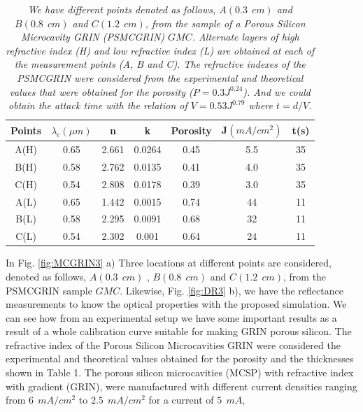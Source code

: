 \documentclass{article}
\begin{document}
\begin{table}
  \centering
  \begin{tabular}{|c|c|c|c|c|c|c|}
    \hline
    \textbf{Points} & $\lambda_c (\mu m)$ & \textbf{n} & \textbf{k} & \textbf{Porosity} & \textbf{J}$(mA/cm^2)$ & \textbf{t(s)}\\
    \hline
    A(H) & 0.65 & 2.661 & 0.0264 & 0.45 & 5.5 & 35 \\
    \hline
    B(H) & 0.58 & 2.762 & 0.0135 & 0.41 & 4.0 & 35 \\
    \hline
    C(H) & 0.54 & 2.808 & 0.0178 & 0.39 & 3.0 & 35 \\
    \hline
    A(L) & 0.65 & 1.442 & 0.0015 & 0.74 & 44 & 11 \\
    \hline
    B(L) & 0.58 & 2.295 & 0.0091 & 0.68 & 32 & 11 \\
    \hline
    C(L) & 0.54 & 2.302 & 0.001 & 0.64 & 24 & 11 \\
    \hline
  \end{tabular}
  \caption{ \emph{We have different points denoted as follows, $ A
      (0.3 \ \ cm) $ and $ B (0.8 \ \ cm) $ and $ C (1.2 \ \ cm) $,
      from the sample of a Porous Silicon Microcavity GRIN
      (PSMCGRIN) $ GMC $. Alternate layers of high refractive index
      (H) and low refractive index (L) are obtained at each of the
      measurement points (A, B and C). The refractive indexes of the
      PSMCGRIN were considered from the experimental and theoretical
      values that were obtained for the porosity ($ P =
      0.3J^{0.24}$). And we could obtain the attack time with the
      relation of $ V = 0.53J ^ {0.79} $ where $ t = d / V $.}}
	\label{tabla:1}
\end{table}
In Fig. \ref{fig:MCGRIN3} a) Three locations at different points are
considered, denoted as follows, $ A (0.3 \ \ cm) $ , $ B (0.8 \ \ cm)
$ and $ C (1.2 \ \ cm) $, from the PSMCGRIN sample $ GMC $. Likewise,
Fig. \ref{fig:DR3} b), we have the reflectance measurements to know
the optical properties with the proposed simulation. We can see how
from an experimental setup we have some important results as a result
of a whole calibration curve suitable for making GRIN porous
silicon. The refractive index of the Porous Silicon Microcavities GRIN
were considered the experimental and theoretical values obtained for
the porosity and the thicknesses shown in Table 1. The porous silicon
microcavities (MCSP) with refractive index with gradient (GRIN), were
manufactured with different current densities ranging from $ 6 \ \ mA
/ cm ^ 2 $ to $ 2.5 \ \ mA / cm ^ 2 $ for a current of $ 5 \ \ mA $,
\end{document}
